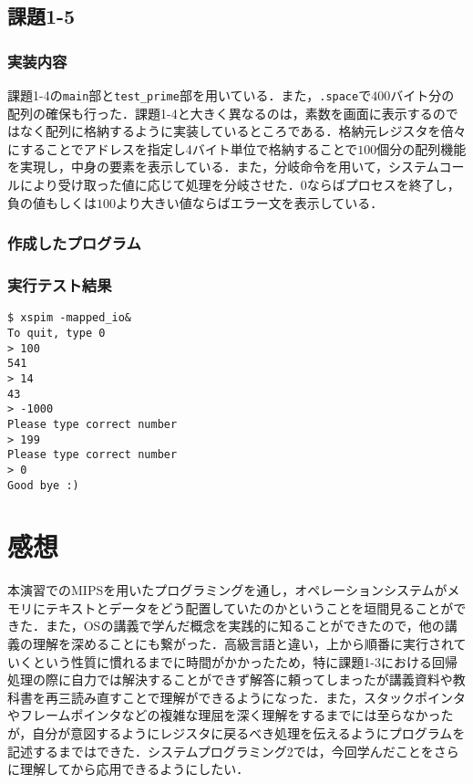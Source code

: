 \documentclass[a4j,11pt]{jarticle}
\begin{document}
 \subsection{課題1-5}
  \subsubsection{実装内容}
  課題1-4の\verb|main|部と\verb|test_prime|部を用いている．また，\verb|.space|で$400$バイト分の配列の確保も行った．課題1-4と大きく異なるのは，素数を画面に表示するのではなく配列に格納するように実装しているところである．格納元レジスタを倍々にすることでアドレスを指定し4バイト単位で格納することで$100$個分の配列機能を実現し，中身の要素を表示している．また，分岐命令を用いて，システムコールにより受け取った値に応じて処理を分岐させた．0ならばプロセスを終了し，負の値もしくは$100$より大きい値ならばエラー文を表示している．
  \subsubsection{作成したプログラム}
   
   \subsubsection{実行テスト結果}
   \begin{verbatim}
$ xspim -mapped_io&
To quit, type 0
> 100
541
> 14
43
> -1000
Please type correct number
> 199
Please type correct number
> 0
Good bye :)
   \end{verbatim}

\section{感想}
本演習でのMIPSを用いたプログラミングを通し，オペレーションシステムがメモリにテキストとデータをどう配置していたのかということを垣間見ることができた．また，OSの講義で学んだ概念を実践的に知ることができたので，他の講義の理解を深めることにも繋がった．高級言語と違い，上から順番に実行されていくという性質に慣れるまでに時間がかかったため，特に課題1-3における回帰処理の際に自力では解決することができず解答に頼ってしまったが講義資料や教科書を再三読み直すことで理解ができるようになった．また，スタックポインタやフレームポインタなどの複雑な理屈を深く理解をするまでには至らなかったが，自分が意図するようにレジスタに戻るべき処理を伝えるようにプログラムを記述するまではできた．システムプログラミング2では，今回学んだことをさらに理解してから応用できるようにしたい．
\end{document}
